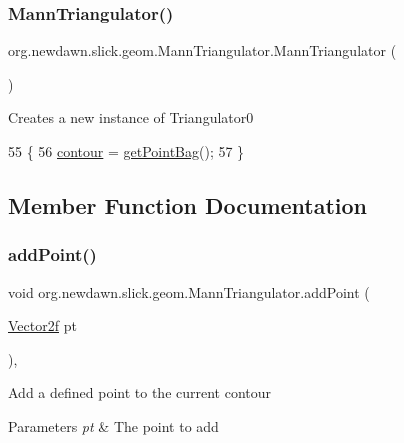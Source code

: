 \subsubsection{\texorpdfstring{Mann\+Triangulator()}{MannTriangulator()}}
{\footnotesize\ttfamily org.\+newdawn.\+slick.\+geom.\+Mann\+Triangulator.\+Mann\+Triangulator (\begin{DoxyParamCaption}{ }\end{DoxyParamCaption})\hspace{0.3cm}{\ttfamily [inline]}}

Creates a new instance of Triangulator0 
\begin{DoxyCode}
55                               \{
56         \mbox{\hyperlink{classorg_1_1newdawn_1_1slick_1_1geom_1_1_mann_triangulator_a94eff0c5ad39ce0c232815591fe3f2d8}{contour}} = \mbox{\hyperlink{classorg_1_1newdawn_1_1slick_1_1geom_1_1_mann_triangulator_abff661e95ea77ddb64a185bd989ee933}{getPointBag}}();
57     \}
\end{DoxyCode}


\subsection{Member Function Documentation}
\mbox{\label{classorg_1_1newdawn_1_1slick_1_1geom_1_1_mann_triangulator_a596f4e31b0c8294d3a75115323d5c458}} 
\subsubsection{\texorpdfstring{add\+Point()}{addPoint()}}
{\footnotesize\ttfamily void org.\+newdawn.\+slick.\+geom.\+Mann\+Triangulator.\+add\+Point (\begin{DoxyParamCaption}\item[{\mbox{\hyperlink{classorg_1_1newdawn_1_1slick_1_1geom_1_1_vector2f}{Vector2f}}}]{pt }\end{DoxyParamCaption})\hspace{0.3cm}{\ttfamily [inline]}, {\ttfamily [private]}}

Add a defined point to the current contour


\begin{DoxyParams}{Parameters}
{\em pt} & The point to add \\
\hline
\end{DoxyParams}


